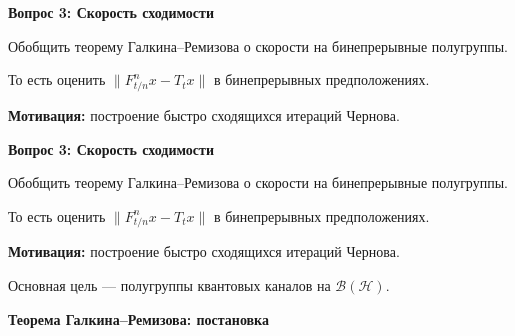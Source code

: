 \documentclass[11pt]{article}
\newcommand{\Hilb}{\mathcal{H}}
\begin{document}
\begin{center}
{\color{notaeYELLOW}\bfseries\fontsize{44}{52}\selectfont Вопрос 3: Скорость сходимости}
\end{center}
\vspace*{\fill}
\begin{center}
\fontsize{36}{43}\selectfont
\parbox{\linewidth}{\centering\noindent Обобщить теорему Галкина--Ремизова о скорости на бинепрерывные полугруппы.
\par}\vspace{0.4in}
\parbox{\linewidth}{\centering\noindent То есть оценить $\|F_{t/n}^n x-T_t x\|$ в бинепрерывных предположениях.
\par}\vspace{0.4in}
\parbox{\linewidth}{\centering\noindent \textbf{Мотивация:} построение быстро сходящихся итераций Чернова.
\par}\vspace{0.4in}
\end{center}
\vspace*{\fill}

\newpage

\begin{center}
{\color{notaeYELLOW}\bfseries\fontsize{44}{52}\selectfont Вопрос 3: Скорость сходимости}
\end{center}
\vspace*{\fill}
\begin{center}
\fontsize{36}{43}\selectfont
\parbox{\linewidth}{\centering\noindent Обобщить теорему Галкина--Ремизова о скорости на бинепрерывные полугруппы.
\par}\vspace{0.4in}
\parbox{\linewidth}{\centering\noindent То есть оценить $\|F_{t/n}^n x-T_t x\|$ в бинепрерывных предположениях.
\par}\vspace{0.4in}
\parbox{\linewidth}{\centering\noindent \textbf{Мотивация:} построение быстро сходящихся итераций Чернова.
\par}\vspace{0.4in}
\parbox{\linewidth}{\centering\noindent Основная цель --- полугруппы квантовых каналов на $\mathcal{B}(\Hilb)$.
\par}\vspace{0.4in}
\end{center}
\vspace*{\fill}

\newpage

\begin{center}
{\color{notaeYELLOW}\bfseries\fontsize{44}{52}\selectfont Теорема Галкина--Ремизова: постановка}
\end{center}
\vspace*{\fill}
\begin{center}
\fontsize{36}{43}\selectfont
\end{center}
\vspace*{\fill}
\end{document}
